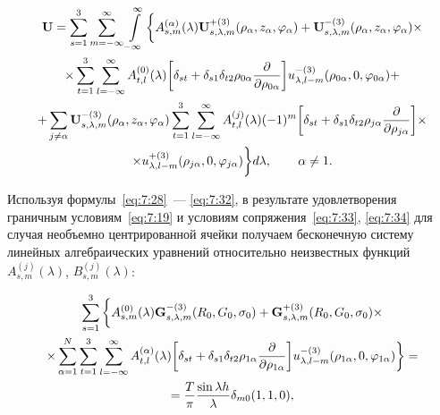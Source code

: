 \begin{multline}
{\bf{U}} = \sum\limits_{s = 1}^3 {\sum\limits_{m =  - \infty }^\infty  {\int\limits_{ - \infty }^\infty  \bigg\{  } } A_{s,m}^{(\alpha )}(\lambda ){\bf{U}}_{s,\lambda ,m}^{ + (3)}({\rho _\alpha },{z_\alpha },{\varphi _\alpha }) + {\bf{U}}_{s,\lambda ,m}^{ - (3)}({\rho _\alpha },{z_\alpha },{\varphi _\alpha }) \times \\
\times \sum\limits_{t = 1}^3 {\sum\limits_{l =  - \infty }^\infty  {A_{t,l}^{(0)}} } (\lambda )\bigg[{\delta _{st}} + {\delta _{s1}}{\delta _{t2}}{\rho _{0\alpha }}\frac{\partial }{{\partial {\rho _{0\alpha }}}}\bigg]u_{\lambda ,l - m}^{ - (3)}({\rho _{0\alpha }},0,{\varphi _{0\alpha }}) + \\
+ \sum\limits_{j \ne \alpha } {{\bf{U}}_{s,\lambda ,m}^{ - (3)}} ({\rho _\alpha },{z_\alpha },{\varphi _\alpha })\sum\limits_{t = 1}^3 {\sum\limits_{l =  - \infty }^\infty  {A_{t,l}^{(j)}} } (\lambda ){( - 1)^m}\bigg[{\delta _{st}} + {\delta _{s1}}{\delta _{t2}}{\rho _{j\alpha }}\frac{\partial }{{\partial {\rho _{j\alpha }}}}\bigg] \times \\
\times u_{\lambda ,l - m}^{ + (3)}({\rho _{j\alpha }},0,{\varphi _{j\alpha }})\bigg\} d\lambda ,\qquad {\kern 1pt} \alpha  \ne 1.
\label{eq:7:32}
\end{multline}

Используя формулы~\eqref{eq:7:28}~--- \eqref{eq:7:32}, в результате удовлетворения граничным условиям~\eqref{eq:7:19} и условиям сопряжения~\eqref{eq:7:33}, \eqref{eq:7:34} для случая необъемно центрированной ячейки получаем бесконечную систему линейных алгебраических уравнений относительно неизвестных функций $A_{s,m}^{(j)}(\lambda)$, $B_{s,m}^{(j)}(\lambda)$:

\begin{multline}
\sum\limits_{s = 1}^3 \bigg\{  A_{s,m}^{(0)}(\lambda ){\bf{G}}_{s,\lambda ,m}^{ - (3)}({R_0},{G_0},{\sigma _0}) + {\bf{G}}_{s,\lambda ,m}^{ + (3)}({R_0},{G_0},{\sigma _0}) \times \\
\times \sum\limits_{\alpha  = 1}^N {\sum\limits_{t = 1}^3 {\sum\limits_{l =  - \infty }^\infty  {A_{t,l}^{(\alpha )}} } } (\lambda )\bigg[{\delta _{st}} + {\delta _{s1}}{\delta _{t2}}{\rho _{1\alpha }}\frac{\partial }{{\partial {\rho _{1\alpha }}}}\bigg]u_{\lambda ,l - m}^{ - (3)}({\rho _{1\alpha }},0,{\varphi _{1\alpha }})\bigg\}  = \\
= \frac{T}{\pi }\frac{{\sin \lambda h}}{\lambda }{\delta _{m0}}(1,1,0),
\end{multline}


